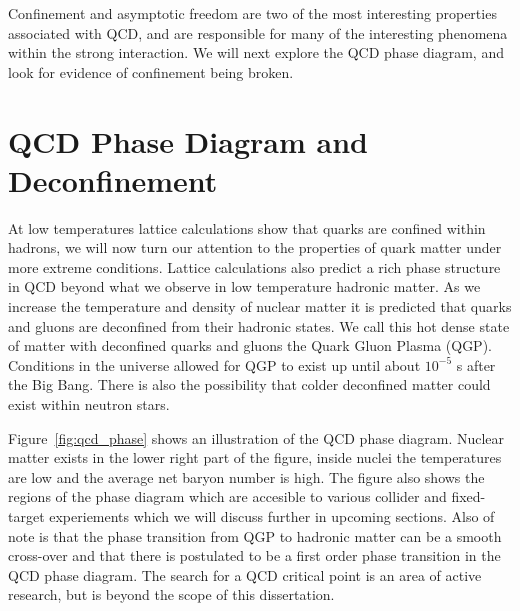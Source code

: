 Confinement and asymptotic freedom are two of the most interesting properties associated with QCD, and are responsible for many of the interesting phenomena within the strong interaction. We will next explore the QCD phase diagram, and look for evidence of confinement being broken.  

\section{QCD Phase Diagram and Deconfinement}

At low temperatures lattice calculations show that quarks are confined within hadrons, we will now turn our attention to the properties of quark matter under more extreme conditions. Lattice calculations also predict a rich phase structure in QCD beyond what we observe in low temperature hadronic matter. As we increase the temperature and density of nuclear matter it is predicted that quarks and gluons are deconfined from their hadronic states. We call this hot dense state of matter with deconfined quarks and gluons the Quark Gluon Plasma (QGP). Conditions in the universe allowed for QGP to exist up until about $10^{-5}$ s after the Big Bang. There is also the possibility that colder deconfined matter could exist within neutron stars.

Figure~\ref{fig:qcd_phase} shows an illustration of the QCD phase diagram. Nuclear matter exists in the lower right part of the figure, inside nuclei the temperatures are low and the average net baryon number is high. The figure also shows the regions of the phase diagram which are accesible to various collider and fixed-target experiements which we will discuss further in upcoming sections. Also of note is that the phase transition from QGP to hadronic matter can be a smooth cross-over and that there is postulated to be a first order phase transition in the QCD phase diagram. The search for a QCD critical point is an area of active research, but is beyond the scope of this dissertation. 

